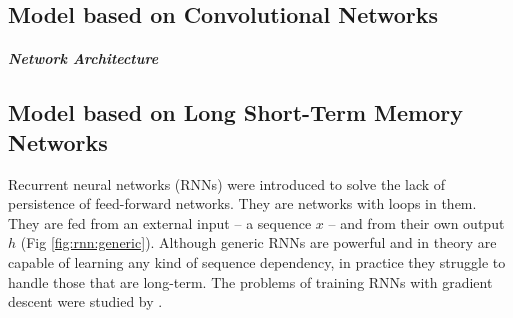 \subsection{Model based on Convolutional Networks}\label{sec:models:cnn}

\subparagraph*{Network Architecture}

\subsection{Model based on Long Short-Term Memory Networks}\label{sec:models:lstm}

Recurrent neural networks (RNNs) were introduced to solve the lack of persistence of feed-forward networks. They are networks with loops in them. They are fed from an external input -- a sequence $x$ -- and from their own output $h$ (Fig \ref{fig:rnn:generic}). Although generic RNNs are powerful and in theory are capable of learning any kind of sequence dependency, in practice they struggle to handle those that are long-term. The problems of training RNNs with gradient descent were studied by .

